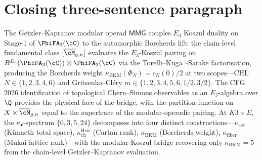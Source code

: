 
\section{Closing three-sentence paragraph}

The Getzler--Kapranov modular operad $\mathsf{MMG}$ couples $E_3$
Koszul duality on Stage-$1$ of $\PhiFA_3(\cC)$ to the automorphic
Borcherds lift: the chain-level fundamental class
$[\overline{\cM}_{g, n}]$ evaluates the $E_3$-Koszul pairing on
$B^{E_3}(\PhiFA_3(\cC)) \otimes \PhiFA_3(\cC)$ via the Torelli--Kuga
--Satake factorisation, producing the Borcherds weight
$\kappa_{\mathrm{BKM}}(\Phi_N) = c_N(0)/2$ at two scopes---CHL
$N \in \{1, 2, 3, 4, 6\}$ and Gritsenko--Cl\'ery $m \in \{1, 2, 3, 4,
5, 6, 1/2, 3/2\}$. The CFG $2026$ identification of topological
Chern--Simons observables as an $E_3$-algebra over $\Q$ provides the
physical face of the bridge, with the partition function on
$X \times \overline{\cM}_{g, n}$ equal to the supertrace of the
modular-operadic pairing. At $K3 \times E$, the
$\kappa_\bullet$-spectrum $\{0, 3, 5, 24\}$ decomposes into four
distinct constructions---$\kappa_{\mathrm{cat}}$ (K\"unneth total
space), $\kappa_{\mathrm{ch}}^{\mathrm{Heis}}$ (Cartan rank),
$\kappa_{\mathrm{BKM}}$ (Borcherds weight), $\kappa_{\mathrm{fiber}}$
(Mukai lattice rank)---with the modular-Koszul bridge recovering only
$\kappa_{\mathrm{BKM}} = 5$ from the chain-level Getzler--Kapranov
evaluation.

